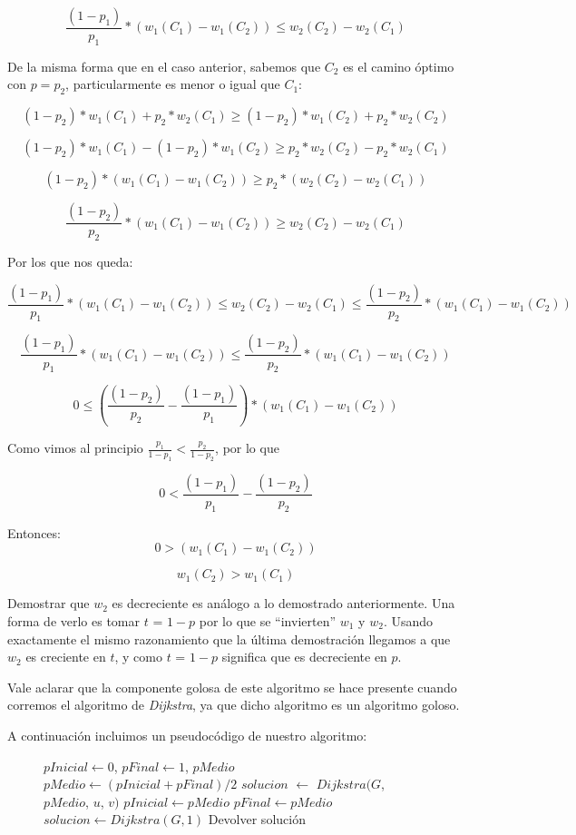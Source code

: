$$\frac{(1-p_1)}{p_1}*(w_1(C_1) - w_1(C_2)) \leq  w_2(C_2) - w_2(C_1) $$

De la misma forma que en el caso anterior, sabemos que $C_2$ es el camino óptimo con $p=p_2$, particularmente es menor o igual que $C_1$:

$$(1-p_2)*w_1(C_1) + p_2*w_2(C_1) \geq (1-p_2)*w_1(C_2) + p_2*w_2(C_2) $$

$$(1-p_2)*w_1(C_1) - (1-p_2)*w_1(C_2) \geq  p_2*w_2(C_2) - p_2*w_2(C_1) $$

$$(1-p_2)*(w_1(C_1) - w_1(C_2)) \geq  p_2*(w_2(C_2) - w_2(C_1)) $$

$$\frac{(1-p_2)}{p_2}*(w_1(C_1) - w_1(C_2)) \geq  w_2(C_2) - w_2(C_1) $$

Por los que nos queda:

$$\frac{(1-p_1)}{p_1}*(w_1(C_1) - w_1(C_2)) \leq  w_2(C_2) - w_2(C_1) \leq \frac{(1-p_2)}{p_2}*(w_1(C_1) - w_1(C_2))$$

$$\frac{(1-p_1)}{p_1}*(w_1(C_1) - w_1(C_2)) \leq \frac{(1-p_2)}{p_2}*(w_1(C_1) - w_1(C_2))$$

$$ 0 \leq (\frac{(1-p_2)}{p_2} - \frac{(1-p_1)}{p_1})*(w_1(C_1) - w_1(C_2))$$

Como vimos al principio $\frac{p_1}{1-p_1} < \frac{p_2}{1-p_2}$, por lo que 

$$0 < \frac{(1-p_1)}{p_1} - \frac{(1-p_2)}{p_2} $$

Entonces:
$$ 0 > (w_1(C_1) - w_1(C_2))$$

$$w_1(C_2) > w_1(C_1)$$

Demostrar que $w_2$ es decreciente es análogo a lo demostrado anteriormente. Una forma de verlo es tomar $t$ = $1-p$ por lo que se ``invierten'' $w_1$ y $w_2$. Usando exactamente el mismo razonamiento que la última demostración llegamos a que $w_2$ es creciente en $t$, y como $t$ = $1-p$ significa que es decreciente en $p$.

Vale aclarar que la componente golosa de este algoritmo se hace presente cuando corremos el algoritmo de \emph{Dijkstra}, ya que dicho algoritmo es un algoritmo goloso.

A continuación incluimos un pseudocódigo de nuestro algoritmo:

\begin{center}
 \begin{figure}[H]
  \begin{pseudo}
    \State $pInicial \leftarrow 0$, $pFinal \leftarrow 1$, $pMedio$
      \State $pMedio \leftarrow (pInicial + pFinal)/2$
      \State $solucion$ $\leftarrow$ $Dijkstra(G$, $pMedio$, $u$, $v)$
	 \State $pInicial \leftarrow pMedio$
      \Else
	 \State $pFinal \leftarrow pMedio$
      \EndIf
    \EndFor
      \State $solucion \leftarrow Dijkstra(G, 1)$
    \EndIf
    \State Devolver solución
   \EndProcedure
  \end{pseudo}
 \end{figure}
\end{center}